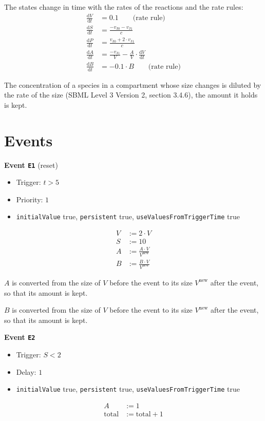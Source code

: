 \documentclass{article}
\begin{document}
The states change in time with the rates of the reactions and the rate rules:
\begin{align*}
  \frac{\mathrm{d} V}{\mathrm{d} t} &= 0.1 \qquad \text{(rate rule)} \\
  \frac{\mathrm{d} S}{\mathrm{d} t} &= \frac{-v_{\mathrm{J0}} - v_{\mathrm{J1}}}{c} \\
  \frac{\mathrm{d} P}{\mathrm{d} t} &= \frac{v_{\mathrm{J0}} + 2 \cdot v_{\mathrm{J1}}}{c} \\
  \frac{\mathrm{d} A}{\mathrm{d} t} &= \frac{-v_{\mathrm{J1}}}{V} - \frac{A}{V} \cdot \frac{\mathrm{d} V}{\mathrm{d} t} \\
  \frac{\mathrm{d} B}{\mathrm{d} t} &= -0.1 \cdot B \qquad \text{(rate rule)}
\end{align*}

The concentration of a species in a compartment whose size changes is diluted by the rate of the size (SBML Level 3 Version 2, section 3.4.6), the amount it holds is kept.

\section{Events}

\textbf{Event \texttt{E1}} (reset)

\begin{itemize}
  \item Trigger: $t > 5$
  \item Priority: $1$
  \item \texttt{initialValue} true, \texttt{persistent} true, \texttt{useValuesFromTriggerTime} true
\end{itemize}
\begin{align*}
  V &\mathrel{:=} 2 \cdot V \\
  S &\mathrel{:=} 10 \\
  A &\mathrel{:=} \frac{A \cdot V}{V^{\mathrm{new}}} \\
  B &\mathrel{:=} \frac{B \cdot V}{V^{\mathrm{new}}}
\end{align*}

$A$ is converted from the size of $V$ before the event to its size $V^{\mathrm{new}}$ after the event, so that its amount is kept.

$B$ is converted from the size of $V$ before the event to its size $V^{\mathrm{new}}$ after the event, so that its amount is kept.

\textbf{Event \texttt{E2}}

\begin{itemize}
  \item Trigger: $S < 2$
  \item Delay: $1$
  \item \texttt{initialValue} true, \texttt{persistent} true, \texttt{useValuesFromTriggerTime} true
\end{itemize}
\begin{align*}
  A &\mathrel{:=} 1 \\
  \mathrm{total} &\mathrel{:=} \mathrm{total} + 1
\end{align*}
\end{document}
